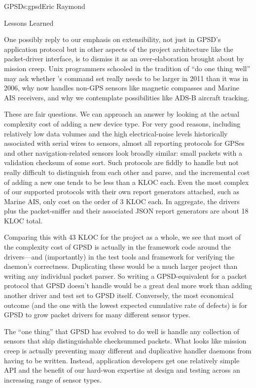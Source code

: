 \begin{aosachapter}{GPSD}{s:gpsd}{Eric Raymond}
\begin{aosasect1}{Lessons Learned}
\begin{enumerate}
\end{enumerate}

One possibly reply to our emphasis on extensibility, not just in
GPSD's application protocol but in other aspects of the project
architecture like the packet-driver interface, is to dismiss it as an
over-elaboration brought about by mission creep.  Unix programmers
schooled in the tradition of ``do one thing well'' may ask whether
's command set really needs to be larger in 2011 than it
was in 2006, why  now handles non-GPS sensors like magnetic
compasses and Marine AIS receivers, and why we contemplate
possibilities like ADS-B aircraft tracking.

These are fair questions. We can approach an answer by looking at the
actual complexity cost of adding a new device type.  For very good
reasons, including relatively low data volumes and the high
electrical-noise levels historically associated with serial wires to
sensors, almost all reporting protocols for GPSes and other
navigation-related sensors look broadly similar: small packets with a
validation checksum of some sort.  Such protocols are fiddly to handle
but not really difficult to distinguish from each other and parse, and
the incremental cost of adding a new one tends to be less than a KLOC
each. Even the most complex of our supported protocols with their own
report generators attached, such as Marine AIS, only cost on the order
of 3 KLOC each. In aggregate, the drivers plus the packet-sniffer and
their associated JSON report generators are about 18 KLOC total.

Comparing this with 43 KLOC for the project as a whole, we see that
most of the complexity cost of GPSD is actually in the framework code
around the drivers---and (importantly) in the test tools and framework
for verifying the daemon's correctness.  Duplicating these would be a
much larger project than writing any individual packet parser.  So
writing a GPSD-equivalent for a packet protocol that GPSD doesn't
handle would be a great deal more work than adding another driver and
test set to GPSD itself.  Conversely, the most economical outcome (and
the one with the lowest expected cumulative rate of defects) is for
GPSD to grow packet drivers for many different sensor types.

The ``one thing'' that GPSD has evolved to do well is handle any
collection of sensors that ship distinguishable checksummed packets.
What looks like mission creep is actually preventing many different
and duplicative handler daemons from having to be written.  Instead,
application developers get one relatively simple API and the benefit
of our hard-won expertise at design and testing across an increasing
range of sensor types.


\end{aosasect1}
\end{aosachapter}
